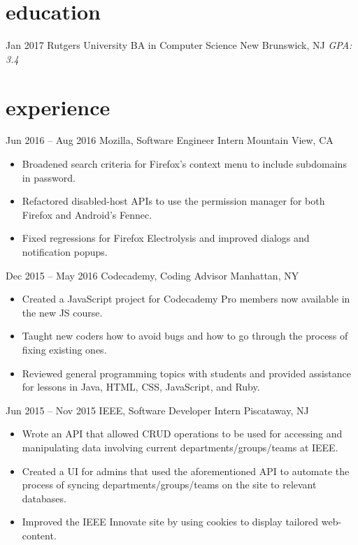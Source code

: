 \documentclass[a4paper]{friggeri-cv}
\begin{document}


\section{education}

\begin{entrylist}
  \entry
    {Jan 2017}
    {Rutgers University {\normalfont BA in Computer Science}}
    {New Brunswick, NJ}
    {\emph{GPA: 3.4}}
\end{entrylist}

\section{experience}

\begin{entrylist}
  \entry
    {Jun 2016 – Aug 2016}
    {Mozilla, Software Engineer Intern}
    {Mountain View, CA}
    {\vspace{-3mm}\begin{itemize}[leftmargin=10pt,itemsep=4pt]
     \item Broadened search criteria for Firefox’s context menu to include subdomains in password.
     \item Refactored disabled-host APIs to use the permission manager for both Firefox and Android’s Fennec.
     \item Fixed regressions for Firefox Electrolysis and improved dialogs and notification popups.
     \end{itemize}}
  \entry
    {Dec 2015 – May 2016}
    {Codecademy, Coding Advisor}
    {Manhattan, NY}
    {\vspace{-3mm}\begin{itemize}[leftmargin=10pt,itemsep=4pt]
     \item Created a JavaScript project for Codecademy Pro members now available in the new JS course.
     \item Taught new coders how to avoid bugs and how to go through the process of fixing existing ones.
     \item Reviewed general programming topics with students and provided assistance for lessons in Java, HTML, CSS, JavaScript, and Ruby.
     \end{itemize}}
  \entry
    {Jun 2015 – Nov 2015}
    {IEEE, Software Developer Intern}
    {Piscataway, NJ}
    {\vspace{-3mm}\begin{itemize}[leftmargin=10pt,itemsep=4pt]
     \item Wrote an API that allowed CRUD operations to be used for accessing and manipulating data involving current departments/groups/teams at IEEE.
     \item Created a UI for admins that used the aforementioned API to automate the process of syncing departments/groups/teams on the site to relevant databases.
     \item Improved the IEEE Innovate site by using cookies to display tailored web-content.
     \end{itemize}}
\end{entrylist}
\end{document}
